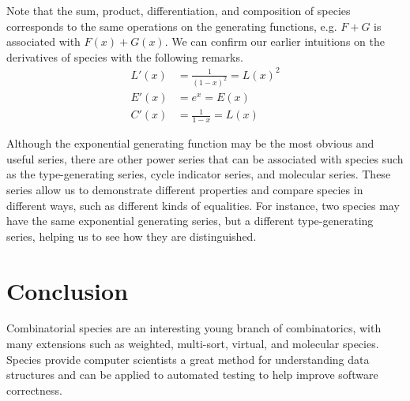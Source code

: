 \documentclass{article}
\begin{document}
Note that the sum, product, differentiation, and composition of species corresponds to the same
operations on the generating functions, e.g. \( F + G \) is associated with \( F(x) + G(x) \). We
can confirm our earlier intuitions on the derivatives of species with the following remarks.
{\setlength{\jot}{\baselineskip}
  \begin{align*}
    L'(x) & = \frac{1}{{(1 - x)}^2} = {L(x)}^2 \\
    E'(x) & = e^x                   = E(x)     \\
    C'(x) & = \frac{1}{1 - x}       = L(x)
  \end{align*}
}

Although the exponential generating function may be the most obvious and useful series, there are
other power series that can be associated with species such as the type-generating series, cycle
indicator series, and molecular series. These series allow us to demonstrate different properties
and compare species in different ways, such as different kinds of equalities. For instance, two
species may have the same exponential generating series, but a different type-generating series,
helping us to see how they are distinguished.~\cite{bergeron, labelle}

\section{Conclusion}
Combinatorial species are an interesting young branch of combinatorics, with many extensions such as
weighted, multi-sort, virtual, and molecular species.~\cite{yorgey} Species provide computer
scientists a great method for understanding data structures and can be applied to automated testing
to help improve software correctness.

\printbibliography{}
\end{document}
